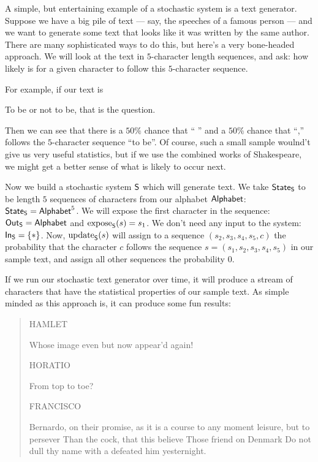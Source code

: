 \documentclass[DynamicalBook]{subfiles}
\begin{document}
\begin{example}\label{ex.markov_text_generator}
  A simple, but entertaining example of a stochastic system is a text generator.
  Suppose we have a big pile of text --- say, the speeches of a famous person
  --- and we want to generate some text that looks like it was written by the
  same author. There are many sophisticated ways to do this, but here's a very
  bone-headed approach. We will look at the text in $5$-character length
  sequences, and ask: how likely is for a given character to follow this
  $5$-character sequence.

  For example, if our text is
  \begin{center}
To be or not to be, that is the question.
  \end{center}
Then we can see that there is a $50\%$ chance that `` '' and a $50\%$ chance
that ``,'' follows the $5$-character sequence ``to be''. Of course, such a small
sample woulnd't give us very useful statistics, but if we use the combined works
of Shakespeare, we might get a better sense of what is likely to occur next.

Now we build a stochastic system $\mathsf{S}$ which will generate text. We take
$\mathsf{State}_{\mathsf{S}}$ to be length $5$ sequences of characters from our alphabet
$\mathsf{Alphabet}$: $\mathsf{State}_{\mathsf{S}} = \mathsf{Alphabet}^5$. We will
expose the first character in the sequence: $\mathsf{Out}_{\mathsf{S}} = \mathsf{Alphabet}$ and $\mathrm{expose}_{\mathsf{S}}(s) = s_1$. We don't need any
input to the system: $\mathsf{In}_{\mathsf{S}} = \{\ast\}$. Now, $\mathrm{update}_{\mathsf{S}}(s)$ will assign to a
sequence $(s_2, s_3, s_4, s_5, c)$ the probability that the character $c$
follows the sequence $s = (s_1, s_2, s_3, s_4, s_5)$ in our sample text, and
assign all other sequences the probability $0$.

If we run our stochastic text generator over time, it will produce a stream of
characters that have the statistical properties of our sample text. As simple
minded as this approach is, it can produce some fun results:
\begin{quote}
  HAMLET

    Whose image even but now appear'd again!

HORATIO

    From top to toe?

FRANCISCO

    Bernardo, on their promise, as it is a course to any moment leisure, but to persever
    Than the cock, that this believe
    Those friend on Denmark
    Do not dull thy name with a defeated him yesternight.
\end{quote}
\end{example}
\end{document}
